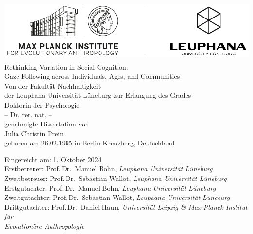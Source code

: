 \documentclass[
]{scrbook}
\author{}
\date{\vspace{-2.5em}}
\begin{document}
\frontmatter

\begin{titlepage}                   
    \begin{center}
        \includegraphics[height=3.2cm]{logo.pdf}\\[40mm]
        
        \huge {\linespread{1.5} Rethinking Variation in Social Cognition: \\ Gaze Following across Individuals, Ages, and Communities}\\[30mm]
        
                
        \normalsize Von der Fakultät Nachhaltigkeit \\ der Leuphana Universität Lüneburg zur Erlangung des Grades\\
        Doktorin der Psychologie\\-- Dr. rer. nat. --\\[10mm]
        
        genehmigte Dissertation von\\[10mm]
        Julia Christin Prein\\
        geboren am 26.02.1995 in Berlin-Kreuzberg, Deutschland
        
    \vspace*{\fill} 
    \end{center}
    
    \newpage
    \thispagestyle{empty}
    \begin{flushleft}
      \begin{normalsize}
      
      \vspace*{\fill} 
            Eingereicht am: \tabto*{30mm} 1. Oktober 2024 \\[10mm]
            
            Erstbetreuer: \tabto*{30mm} Prof.\,Dr.\, Manuel Bohn, \textit{Leuphana Universität Lüneburg}\\
                Zweitbetreuer: \tabto*{30mm} Prof.\,Dr.\, Sebastian Wallot, \textit{Leuphana Universität Lüneburg}\\[10mm]
                
                Erstgutachter: \tabto*{30mm} Prof.\,Dr.\, Manuel Bohn, \textit{Leuphana Universität Lüneburg}\\
                Zweitgutachter: \tabto*{30mm} Prof.\,Dr.\, Sebastian Wallot, \textit{Leuphana Universität Lüneburg}\\
                Drittgutachter: \tabto*{30mm} Prof.\,Dr.\, Daniel Haun, \textit{Universität Leipzig \& Max-Planck-Institut für\\
                \tabto*{30mm} Evolutionäre Anthropologie}\\[10mm]
        \end{normalsize}
    \end{flushleft}
    

\end{titlepage}
\end{document}
